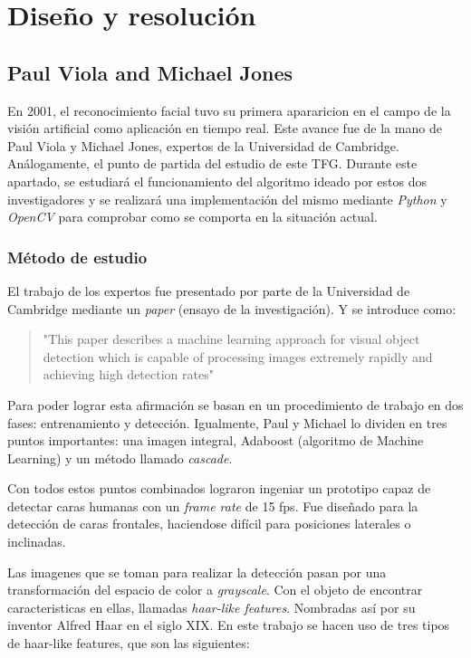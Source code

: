 
\chapter{Diseño y resolución}

\linespread{1.5}

\section{Paul Viola and Michael Jones}

En 2001, el reconocimiento facial tuvo su primera apararicion en el campo de la visión artificial como aplicación en tiempo real. Este avance fue de la mano de Paul Viola y Michael Jones, expertos de la Universidad de Cambridge. Análogamente, el punto de partida del estudio de este TFG. Durante este apartado, se estudiará el funcionamiento del algoritmo ideado por estos dos investigadores y se realizará una implementación del mismo mediante \textit{Python} y \textit{OpenCV} para comprobar como se comporta en la situación actual.

\subsection*{Método de estudio}

El trabajo de los expertos fue presentado por parte de la Universidad de Cambridge mediante un \textit{paper} (ensayo de la investigación). Y se introduce como: 
\begin{quote}
	"This paper describes a machine learning approach for visual object detection which is capable of processing images extremely rapidly and achieving high detection rates" \cite{paulViola}
\end{quote}

Para poder lograr esta afirmación se basan en un procedimiento de trabajo en dos fases: entrenamiento y detección. Igualmente, Paul y Michael lo dividen en tres puntos importantes: una imagen integral, Adaboost (algoritmo de Machine Learning) y un método llamado \textit{cascade}. 

Con todos estos puntos combinados lograron ingeniar un prototipo capaz de detectar caras humanas con un \textit{frame rate} de 15 fps. Fue diseñado para la detección de caras frontales, haciendose difícil para posiciones laterales o inclinadas.

Las imagenes que se toman para realizar la detección pasan por una transformación del espacio de color a \textit{grayscale}. Con el objeto de encontrar caracteristicas en ellas, llamadas \textit{haar-like features}. Nombradas así por su inventor Alfred Haar en el siglo XIX. En este trabajo se hacen uso de tres tipos de haar-like features, que son las siguientes:

